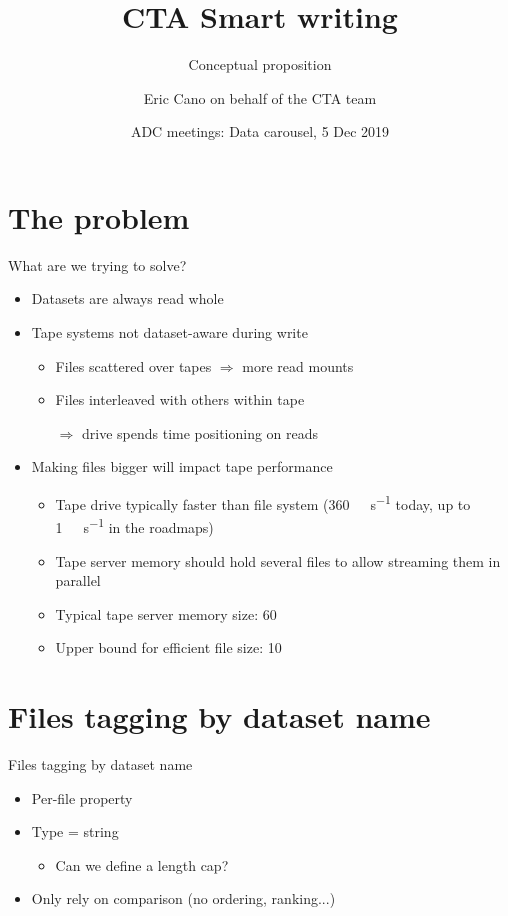 \documentclass[aspectratio=149]{beamer}
\author{Eric Cano on behalf of the CTA team}
\title{CTA Smart writing}
\subtitle{Conceptual proposition}
\date{ADC meetings: Data carousel, 5 Dec 2019}
\begin{document}
\frontcover

\frame{\titlepage}

\frame{\tableofcontents}

\section{The problem}
\begin{frame}{What are we trying to solve?}
  \begin{itemize}
    \item Datasets are always read whole
    \item Tape systems not dataset-aware during write
    \begin{itemize}    
      \item Files scattered over tapes $\Rightarrow$ more read mounts
      \item Files interleaved with others within tape
      
      $\Rightarrow$ drive spends time positioning on reads
    \end{itemize}
    \item Making files bigger will impact tape performance
    \begin{itemize}
      \item Tape drive typically faster than file system (\SI{360}{\mega\byte\per\second} today, up to \SI{1}{\giga\byte\per\second} in the roadmaps)
      \item Tape server memory should hold several files to allow streaming them in parallel
      \item Typical tape server memory size: \SI{60}{\giga\byte}
      \item Upper bound for efficient file size: \SI{10}{\giga\byte}
    \end{itemize}
  \end{itemize}
\end{frame}

\section{Files tagging by dataset name}
\begin{frame}{Files tagging by dataset name}
\begin{itemize}
  \item Per-file property
  \item Type = string
  \begin{itemize}
    \item Can we define a length cap? 
  \end{itemize}
  \item Only rely on comparison (no ordering, ranking...)
\end{itemize}
\end{frame}
\end{document}
